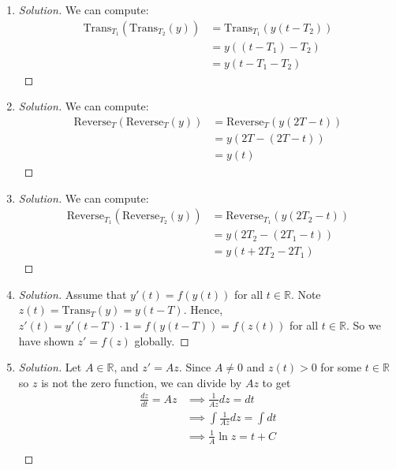\documentclass{article}
\newcommand{\R}{{\mathbb R}}
\begin{document}
\begin{enumerate}
	\item \begin{proof}[Solution]\let\qed\relax
		We can compute:
		\begin{align*}
			\mathrm{Trans}_{T_1}(\mathrm{Trans}_{T_2}(y))
			&= \mathrm{Trans}_{T_1}(y(t-T_2))\\
			&= y((t - T_1) - T_2)\\
			&= y(t - T_1 - T_2)
		\end{align*}
	\end{proof}
	\item \begin{proof}[Solution]\let\qed\relax
		We can compute:
		\begin{align*}
			\mathrm{Reverse}_{T}(\mathrm{Reverse}_{T}(y))
			&= \mathrm{Reverse}_{T}(y(2T-t))\\
			&= y(2T - (2T - t))\\
			&= y(t)
		\end{align*}
	\end{proof}
	\item \begin{proof}[Solution]\let\qed\relax
		We can compute:
		\begin{align*}
			\mathrm{Reverse}_{T_1}(\mathrm{Reverse}_{T_2}(y))
			&= \mathrm{Reverse}_{T_1}(y(2T_2-t))\\
			&= y(2T_2 - (2T_1 - t))\\
			&= y(t + 2T_2 - 2T_1)
		\end{align*}
	\end{proof}
	\item \begin{proof}[Solution]\let\qed\relax
		Assume that $y'(t) = f(y(t))$ for all $t \in \R$.
		Note $z(t) = \mathrm{Trans}_T(y) = y(t-T)$.
		Hence, $z'(t) = y'(t-T)\cdot1 = f(y(t-T)) = f(z(t))$
		for all $t \in \R$.
		So we have shown $z' = f(z)$ globally.
	\end{proof}
	\item \begin{proof}[Solution]\let\qed\relax
		Let $A \in \R$, and $z' = Az$.
		Since $A \neq 0$ and $z(t) > 0$ for some $t \in \R$ so $z$ is not the zero function,
		we can divide by $Az$ to get
		\begin{align*}
			\frac{dz}{dt} = Az
			&\implies \frac{1}{Az}dz = dt\\
			&\implies \int \frac{1}{Az}dz = \int dt\\
			&\implies \frac{1}{A}\ln{z} = t + C\\

\end{align*}
\end{proof}
\end{enumerate}
\end{document}
